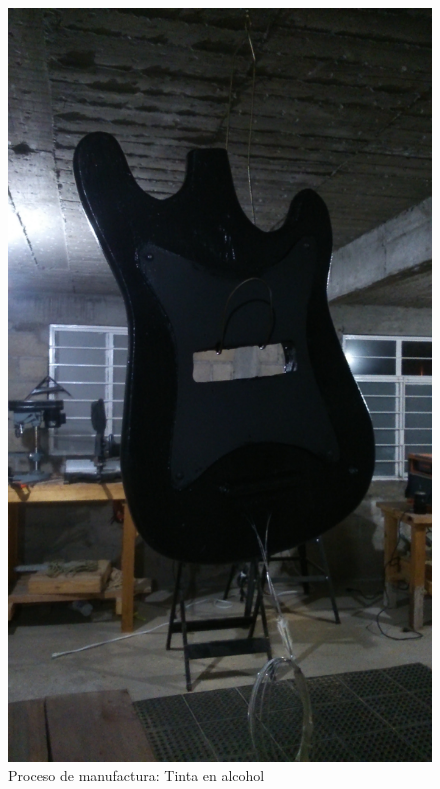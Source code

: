 \begin{figure}[!htbp]
\caption{Proceso de manufactura: Tinta en alcohol}
\centering
\includegraphics [scale=0.1,angle=-90]{./img/DSC_0005.JPG}
\end{figure}

